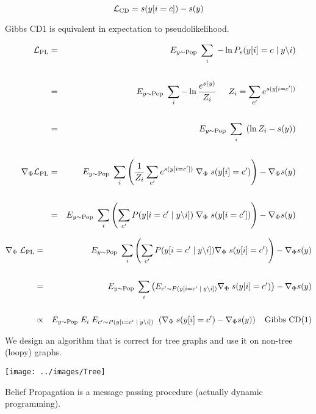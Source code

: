 {\vfill
{\color{red} $${\cal L}_{\mathrm{CD}}  = s(y[i=c]) - s(y)$$}


Gibbs CD1 is equivalent in expectation to pseudolikelihood.

{\huge
\begin{eqnarray*}
{\cal L}_{\mathrm{PL}} & = & E_{y \sim \mathrm{Pop}}\;\sum_i \; - \ln P_s(y[i]=c\;|\;y\backslash i) \\
\\
 & = & E_{y \sim \mathrm{Pop}}\;\sum_i -\ln \frac{e^{s(y)}}{Z_i}\;\;\;\;\;{Z_i = \sum_{c'} e^{s(y[i=c'])}} \\
\\
& = & E_{y \sim \mathrm{Pop}}\;\sum_i\; \left(\ln Z_i - s(y)\right) \\
\\
\nabla_\Phi {\cal L}_{\mathrm{PL}} & = & E_{y \sim \mathrm{Pop}}\;\sum_i \left(\frac{1}{Z_i} \sum_{c'} e^{s(y[i=c'])} \; \nabla_\Phi\;s(y[i]=c')\right) - \nabla_\Phi s(y) \\
\\
& = & E_{y \sim \mathrm{Pop}}\;\sum_i \left(\sum_{c'} P(y[i=c'\;|\;y\backslash i]) \; \nabla_\Phi\;s(y[i=c'])\right) - \nabla_\Phi s(y)
\end{eqnarray*}
}


{\huge
\begin{eqnarray*}
\nabla_\Phi\;{\cal L}_{\mathrm{PL}} & = & E_{y \sim \mathrm{Pop}}\;\sum_i \left(\sum_{c'} P(y[i=c'\;|\;y\backslash i]) \nabla_\Phi\;s(y[i]=c')\right) - \nabla_\Phi s(y) \\
\\
& = & E_{y \sim \mathrm{Pop}}\;\sum_i \left(E_{c' \sim P(y[i=c'\;|\;y\backslash i])} \nabla_\Phi\;s(y[i]=c')\right) - \nabla_\Phi s(y) \\
\\
& \propto & E_{y \sim \mathrm{Pop}}\;E_i\; E_{c' \sim P(y[i=c'\;|\;y\backslash i])}\;\; (\nabla_\Phi\;s(y[i]=c') - \nabla_\Phi s(y))\;\;\;\;\mbox{Gibbs CD(1)}
\end{eqnarray*}
}


We design an algorithm that is correct for tree graphs and use it on non-tree (loopy) graphs.


\centerline{\texttt{[image: ../images/Tree]}}

\vfill
Belief Propagation is a message passing procedure (actually dynamic programming).

}
